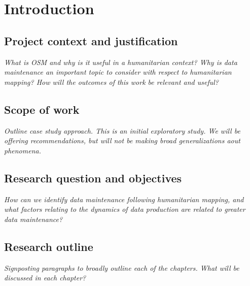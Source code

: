 \chapter{Introduction}
\label{chapterlabel1}

\section{Project context and justification}

\textit{What is OSM and why is it useful in a humanitarian context? Why is data maintenance an important topic to consider with respect to humanitarian mapping? How will the outcomes of this work be relevant and useful?}

\section{Scope of work}

\textit{Outline case study approach. This is an initial exploratory study. We will be offering recommendations, but will not be making broad generalizations aout phenomena.}

\section{Research question and objectives}

\textit{How can we identify data maintenance following humanitarian mapping, and what factors relating to the dynamics of data production are related to greater data maintenance?}

\section{Research outline}

\textit{Signposting paragraphs to broadly outline each of the chapters. What will be discussed in each chapter?}

